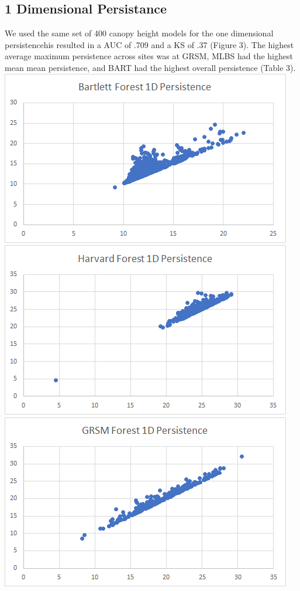 \documentclass[10pt]{article}
\begin{document}
\subsection*{1 Dimensional Persistance}
We used the same set of 400 canopy height models for the one dimensional persistencehis resulted in a AUC of .709 and a KS of .37 (Figure 3). The highest average maximum persistence across sites was at GRSM, MLBS had the highest mean mean persistence, and BART had the highest overall persistence (Table 3).\\
\noindent \includegraphics[scale= 0.5]{bartlett_1d}
\includegraphics[scale= 0.5]{harvard_1d}
\includegraphics[scale= 0.5]{grsm_1d}
\end{document}
